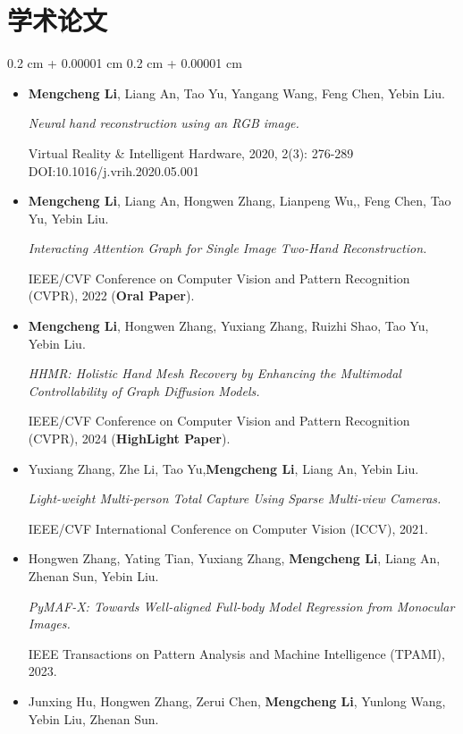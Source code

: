 \documentclass[10pt, letterpaper]{article}
\newenvironment{highlightsforbulletentries}{
    \begin{itemize}[
        topsep=0.10 cm,
        parsep=0.10 cm,
        partopsep=0pt,
        itemsep=0pt,
        leftmargin=10pt
    ]
}{
    \end{itemize}
} %
\newenvironment{onecolentry}{
    \begin{adjustwidth}{
        0.2 cm + 0.00001 cm
    }{
        0.2 cm + 0.00001 cm
    }
}{
    \end{adjustwidth}
} %
\begin{document}
    
    \section{\textbf{学术论文}}

        \begin{onecolentry}
            \begin{highlightsforbulletentries}
                \item \textbf{Mengcheng Li}, Liang An, Tao Yu, Yangang Wang, Feng Chen, Yebin Liu.\par
                \textit{Neural hand reconstruction using an RGB image.}\par
                Virtual Reality \& Intelligent Hardware, 2020, 2(3): 276-289 DOI:10.1016/j.vrih.2020.05.001
                \item \textbf{Mengcheng Li}, Liang An, Hongwen Zhang, Lianpeng Wu,, Feng Chen, Tao Yu, Yebin Liu.\par
                \textit{Interacting Attention Graph for Single Image Two-Hand Reconstruction.}\par
                IEEE/CVF Conference on Computer Vision and Pattern Recognition (CVPR), 2022 (\textbf{Oral Paper}).
                \item \textbf{Mengcheng Li}, Hongwen Zhang, Yuxiang Zhang, Ruizhi Shao, Tao Yu, Yebin Liu.\par
                \textit{HHMR: Holistic Hand Mesh Recovery by Enhancing the Multimodal Controllability of Graph Diffusion Models.}\par
                IEEE/CVF Conference on Computer Vision and Pattern Recognition (CVPR), 2024 (\textbf{HighLight Paper}).
                \item Yuxiang Zhang, Zhe Li, Tao Yu,\textbf{Mengcheng Li}, Liang An, Yebin Liu.\par
                \textit{Light-weight Multi-person Total Capture Using Sparse Multi-view Cameras.}\par
                IEEE/CVF International Conference on Computer Vision (ICCV), 2021.
                \item Hongwen Zhang, Yating Tian, Yuxiang Zhang, \textbf{Mengcheng Li}, Liang An, Zhenan Sun, Yebin Liu.\par
                \textit{PyMAF-X: Towards Well-aligned Full-body Model Regression from Monocular Images.}\par 
                IEEE Transactions on Pattern Analysis and Machine Intelligence (TPAMI), 2023.
                \item Junxing Hu, Hongwen Zhang, Zerui Chen, \textbf{Mengcheng Li}, Yunlong Wang, Yebin Liu, Zhenan Sun.\par

\end{highlightsforbulletentries}
\end{onecolentry}
\end{document}
